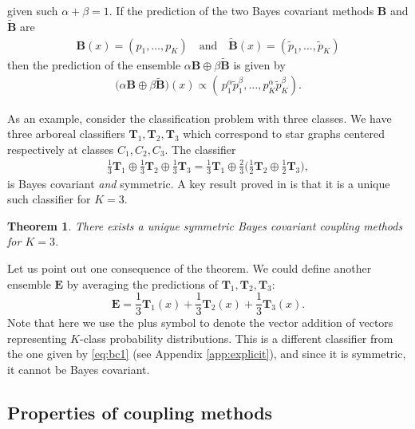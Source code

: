 \documentclass[twoside,11pt]{article}
\newtheorem{thm}{Theorem}
\begin{document}
 given such $\alpha + \beta = 1$. If the prediction of the two Bayes covariant methods $\boldsymbol{B}$ and $\boldsymbol{\tilde B}$ are
\begin{align*}
	\boldsymbol{B}(x) = (p_1, \ldots, p_K)\quad\textrm{and}\quad \boldsymbol{\tilde B}(x) = (\tilde p_1, \ldots, \tilde p_K)
\end{align*}
then the prediction of the ensemble $\alpha 	\boldsymbol{B} \oplus \beta \boldsymbol{\tilde B}$ is given by
\begin{align*}
	\bigl(\alpha 	\boldsymbol{B} \oplus \beta \boldsymbol{\tilde B}\bigr)(x)\propto (\,p_1^\alpha \tilde p_1^\beta, \ldots, p_K^\alpha \tilde p_K^\beta).
\end{align*}

As an example, consider the classification problem with three classes. We have three arboreal classifiers $\boldsymbol{T}_1, \boldsymbol{T}_2, \boldsymbol{T}_3$ which correspond to star graphs centered respectively at classes $C_1, C_2, C_3$. The classifier 
\begin{align}
\frac13 \boldsymbol{T}_1 \oplus \frac13 \boldsymbol{T}_2 \oplus \frac 13 \boldsymbol{T}_3 = \frac13 \boldsymbol{T}_1 \oplus \frac23 \biggl(\frac12 \boldsymbol{T}_2 \oplus \frac 12 \boldsymbol{T}_3
\biggr), \label{eq:bc1}
\end{align}
is Bayes covariant \emph{and} symmetric. A key result proved in \cite{vsuch2016bayes} is that it is a unique such classifier for $K=3$.

\begin{thm}
	There exists a unique symmetric Bayes covariant coupling methods for $K=3$.
\end{thm}

Let us point out one consequence of the theorem. We could define another ensemble $\boldsymbol{E}$ by averaging the predictions of $\boldsymbol{T}_1, \boldsymbol{T}_2, \boldsymbol{T}_3$:
\[
\boldsymbol{E} = \frac13 \boldsymbol{T}_1(x) + \frac13 \boldsymbol{T}_2(x) + \frac 13 \boldsymbol{T}_3(x).
\]
Note that here we use the plus symbol to denote the vector addition of vectors representing $K$-class probability distributions. This is a different classifier from the one given by  \eqref{eq:bc1} (see Appendix \ref{app:explicit}), and since it is symmetric, it cannot be Bayes covariant.

\subsection{Properties of coupling methods}
\end{document}

